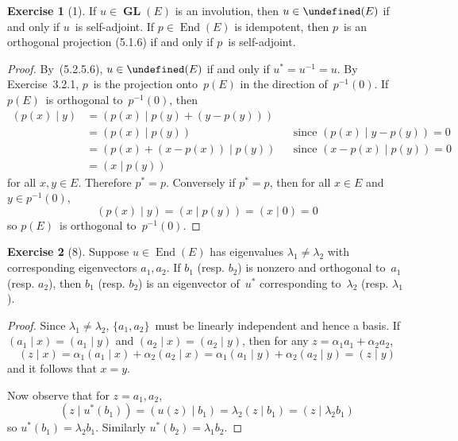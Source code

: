 \documentclass[letterpaper,12pt]{article}
\let\O\undefined %
\DeclareMathOperator{\End}{End}
\DeclareMathOperator{\GL}{\mathbf{GL}}
\DeclareMathOperator{\O}{\mathbf{O}}
\newcommand{\inv}[1]{#1^{-1}}
\newcommand{\kerz}[1]{\inv{#1}(0)}
\newcommand{\innerprod}[2]{({#1}\;|\;{#2})}
\newcommand{\adj}[1]{#1^*}
\theoremstyle{definition}
\newtheorem*{exer}{Exercise}
\theoremstyle{remark}
\begin{document}
\begin{exer}[1]
If \(u\in\GL(E)\) is an involution, then \(u\in\O(E)\) if and only if \(u\)~is self-adjoint. If \(p\in\End(E)\) is idempotent, then \(p\)~is an orthogonal projection (5.1.6) if and only if \(p\)~is self-adjoint.
\end{exer}
\begin{proof}
By~(5.2.5.6), \(u\in\O(E)\) if and only if \(\adj{u}=\inv{u}=u\). By Exercise~3.2.1, \(p\)~is the projection onto~\(p(E)\) in the direction of~\(\kerz{p}\). If \(p(E)\)~is orthogonal to~\(\kerz{p}\), then
\begin{align*}
\innerprod{p(x)}{y}&=\innerprod{p(x)}{p(y)+(y-p(y))}&&\\
	&=\innerprod{p(x)}{p(y)}&&\text{since }\innerprod{p(x)}{y-p(y)}=0\\
	&=\innerprod{p(x)+(x-p(x))}{p(y)}&&\text{since }\innerprod{x-p(x)}{p(y)}=0\\
	&=\innerprod{x}{p(y)}
\end{align*}
for all \(x,y\in E\). Therefore \(\adj{p}=p\). Conversely if \(\adj{p}=p\), then for all \(x\in E\) and \(y\in\kerz{p}\),
\[\innerprod{p(x)}{y}=\innerprod{x}{p(y)}=\innerprod{x}{0}=0\]
so \(p(E)\)~is orthogonal to~\(\kerz{p}\).
\end{proof}

\begin{exer}[8]
Suppose \(u\in\End(E)\) has eigenvalues \(\lambda_1\ne\lambda_2\) with corresponding eigenvectors \(a_1,a_2\). If \(b_1\) (resp. \(b_2\)) is nonzero and orthogonal to~\(a_1\) (resp. \(a_2\)), then \(b_1\) (resp. \(b_2\)) is an eigenvector of~\(\adj{u}\) corresponding to~\(\lambda_2\) (resp. \(\lambda_1\)).
\end{exer}
\begin{proof}
Since \(\lambda_1\ne\lambda_2\), \(\{a_1,a_2\}\)~must be linearly independent and hence a basis. If \(\innerprod{a_1}{x}=\innerprod{a_1}{y}\) and \(\innerprod{a_2}{x}=\innerprod{a_2}{y}\), then for any \(z=\alpha_1a_1+\alpha_2a_2\),
\[\innerprod{z}{x}=\alpha_1\innerprod{a_1}{x}+\alpha_2\innerprod{a_2}{x}=\alpha_1\innerprod{a_1}{y}+\alpha_2\innerprod{a_2}{y}=\innerprod{z}{y}\]
and it follows that \(x=y\).

Now observe that for \(z=a_1,a_2\),
\[\innerprod{z}{\adj{u}(b_1)}=\innerprod{u(z)}{b_1}=\lambda_2\innerprod{z}{b_1}=\innerprod{z}{\lambda_2 b_1}\]
so \(\adj{u}(b_1)=\lambda_2b_1\). Similarly \(\adj{u}(b_2)=\lambda_1b_2\).
\end{proof}
\end{document}
